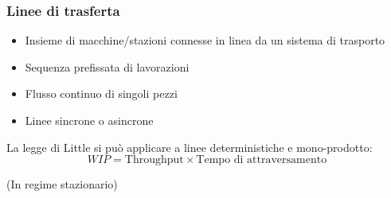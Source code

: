\documentclass{article}
\begin{document}
\newpage

\subsubsection{Linee di trasferta}

\begin{itemize}
    \item Insieme di macchine/stazioni connesse in linea da un sistema di trasporto
    \item Sequenza prefissata di lavorazioni
    \item Flusso continuo di singoli pezzi
    \item Linee sincrone o asincrone\newline
\end{itemize}

\noindent La legge di Little si può applicare a linee deterministiche e mono-prodotto:
$$WIP=\text{Throughput}\times\text{Tempo di attraversamento}$$

\noindent (In regime stazionario)\newline
\end{document}

